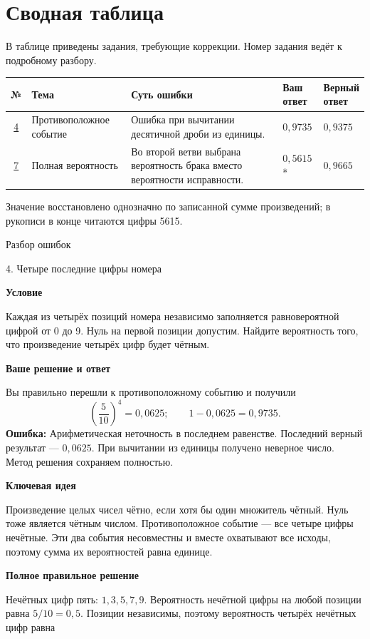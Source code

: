 \documentclass[a4paper,12pt]{article}
\newcommand{\topic}[1]{\par\medskip\textcolor{darkaccent}{\textbf{#1}}\par\nopagebreak}
\newcommand{\err}[1]{\textcolor{error}{\textbf{Ошибка:}} #1}
\newcommand{\task}[2]{\phantomsection\label{task:#1}{\Large\color{accent} #1. #2}\par\medskip}
\begin{document}
\section*{Сводная таблица}
В таблице приведены задания, требующие коррекции. Номер задания ведёт к подробному разбору.
\par\medskip
\begin{tabularx}{\linewidth}{@{}c >{\raggedright\arraybackslash}p{38mm} >{\raggedright\arraybackslash}X p{22mm} p{23mm}@{}}
\toprule
№ & Тема & Суть ошибки & \shortstack[l]{Ваш\\ответ} & \shortstack[l]{Верный\\ответ}\\
\midrule
\hyperref[task:4]{4} & Противоположное событие & Ошибка при вычитании десятичной дроби из единицы. & $0,9735$ & $0,9375$\\
\hyperref[task:7]{7} & Полная вероятность & Во второй ветви выбрана вероятность брака вместо вероятности исправности. & $0,5615$* & $0,9665$\\
\bottomrule
\end{tabularx}\par
\smallskip
{\small * Значение восстановлено однозначно по записанной сумме произведений; в рукописи в конце читаются цифры 5615.}
\clearpage
\thispagestyle{empty}
\vspace*{\fill}
\begin{center}
{\Huge\color{accent} Разбор ошибок}
\end{center}
\vspace*{\fill}
\clearpage
\task{4}{Четыре последние цифры номера}
\topic{Условие}
Каждая из четырёх позиций номера независимо заполняется равновероятной цифрой от 0 до 9. Нуль на первой позиции допустим. Найдите вероятность того, что произведение четырёх цифр будет чётным.
\topic{Ваше решение и ответ}
Вы правильно перешли к противоположному событию и получили
\[
\left(\frac{5}{10}\right)^4=0,0625;\qquad 1-0,0625=0,9735.
\]
\err{Арифметическая неточность в последнем равенстве.} Последний верный результат --- $0,0625$. При вычитании из единицы получено неверное число. Метод решения сохраняем полностью.
\topic{Ключевая идея}
Произведение целых чисел чётно, если хотя бы один множитель чётный. Нуль тоже является чётным числом. Противоположное событие --- все четыре цифры нечётные. Эти два события несовместны и вместе охватывают все исходы, поэтому сумма их вероятностей равна единице.
\topic{Полное правильное решение}
Нечётных цифр пять: $1,3,5,7,9$. Вероятность нечётной цифры на любой позиции равна $5/10=0,5$. Позиции независимы, поэтому вероятность четырёх нечётных цифр равна
\end{document}
